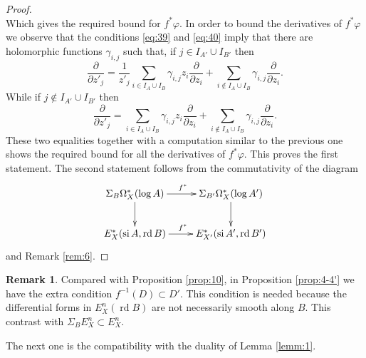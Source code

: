 \documentclass[11pt,a4paper]{amsart}
\DeclareMathOperator{\si}{si}
\DeclareMathOperator{\rd}{rd}
\numberwithin{equation}{section}
\theoremstyle{plain}
\theoremstyle{definition}
\newtheorem{rmk}[prop]{Remark}
\begin{document}
\begin{proof}
\begin{displaymath}
  \end{displaymath}
  Which gives the required bound for $f^{\ast}\varphi$. In order to
  bound the derivatives of $f^{\ast}\varphi$ we observe that the
  conditions \eqref{eq:39} and \eqref{eq:40} imply that there are
  holomorphic functions $\gamma _{i,j}$ such that, if $j\in I_{A'}\cup
  I_{B'}$
  then
  \begin{displaymath}
    \frac{\partial}{\partial z'_{j}}=
    \frac{1}{z'_{j}}\sum_{i\in I_{A}\cup I_{B}}\gamma
    _{i,j}z_{i}\frac{\partial}{\partial z_{i}}+
    \sum _{i\not \in I_{A}\cup I_{B}}\gamma _{i,j} \frac{\partial}{\partial z_{i}}.
  \end{displaymath}
  While if $j\not \in I_{A'}\cup
  I_{B'}$
  then
  \begin{displaymath}
    \frac{\partial}{\partial z'_{j}}=
    \sum_{i\in I_{A}\cup I_{B}}\gamma
    _{i,j}z_{i}\frac{\partial}{\partial z_{i}}+
    \sum _{i\not \in I_{A}\cup I_{B}}\gamma _{i,j} \frac{\partial}{\partial z_{i}}.
  \end{displaymath}
  These two equalities together with a computation similar to the
  previous one shows the required bound for all the derivatives of
  $f^{\ast}\varphi$. This proves the first statement. The second
  statement follows from the commutativity of the diagram
  \begin{displaymath}
    \xymatrix{\Sigma _B\Omega ^{\ast}_{X}(\log A)
      \ar[r]^{f^{\ast}}\ar[d]&
      \Sigma _{B'}\Omega ^{\ast}_{X}(\log A')\ar[d]\\
      E^{\ast}_{X}(\si A, \rd B)\ar[r]^{f^{\ast}}&
      E^{\ast}_{X'}(\si A', \rd B')
    }
  \end{displaymath}
  and Remark \ref{rem:6}.
\end{proof}

\begin{rmk}\label{rmk:4-5'}
  Compared with Proposition \ref{prop:10}, in Proposition
  \ref{prop:4-4'} we have the extra condition $f^{-1}(D)\subset
  D'$. This condition is needed because the differential forms in
  $E^{n}_{X}(\rd B)$ are not necessarily smooth along $B$. This
  contrast with $\Sigma _{B}E^{n}_{X}\subset E^{n}_{X}$.   
\end{rmk}
The next one is the compatibility with the duality of Lemma \ref{lemm:1}. 
\end{document}
